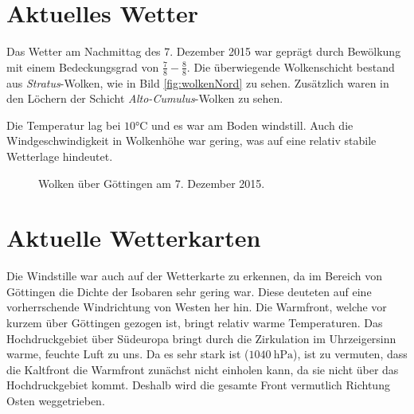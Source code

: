 \documentclass[12pt,a4paper,titlepage,headinclude,bibtotoc]{scrartcl}
\begin{document}
\section{Aktuelles Wetter}
Das Wetter am Nachmittag des 7. Dezember 2015 war geprägt durch Bewölkung mit einem Bedeckungsgrad von $\frac{7}{8}-\frac{8}{8}$.
Die überwiegende Wolkenschicht bestand aus \textit{Stratus}-Wolken, wie in Bild \ref{fig:wolkenNord} zu sehen.
Zusätzlich waren in den Löchern der Schicht \textit{Alto-Cumulus}-Wolken zu sehen.

Die Temperatur lag bei $10\si\celsius$ und es war am Boden windstill.
Auch die Windgeschwindigkeit in Wolkenhöhe war gering, was auf eine relativ stabile Wetterlage hindeutet.

\begin{figure}[h]
  \centering
  \hfill
  \caption{Wolken über Göttingen am 7. Dezember 2015.}
  \label{fig:label-gesamt}
\end{figure}

\section{Aktuelle Wetterkarten}
Die Windstille war auch auf der Wetterkarte zu erkennen, da im Bereich von Göttingen die Dichte der Isobaren sehr gering war.
Diese deuteten auf eine vorherrschende Windrichtung von Westen her hin.
Die Warmfront, welche vor kurzem über Göttingen gezogen ist, bringt relativ warme Temperaturen.
Das Hochdruckgebiet über Südeuropa bringt durch die Zirkulation im Uhrzeigersinn warme, feuchte Luft zu uns.
Da es sehr stark ist ($\SI{1040}{\hecto\pascal}$), ist zu vermuten, dass die Kaltfront die Warmfront zunächst nicht einholen kann, da sie nicht über das Hochdruckgebiet kommt.
Deshalb wird die gesamte Front vermutlich Richtung Osten weggetrieben.
\end{document}
